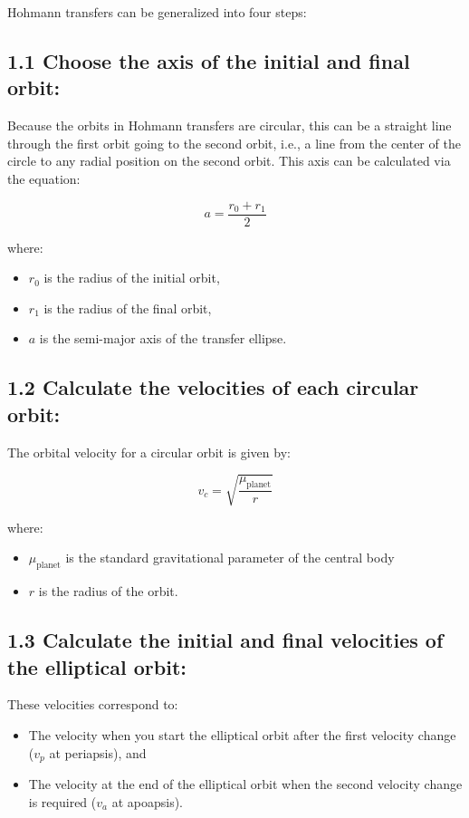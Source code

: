 \documentclass{article}
\numberwithin{figure}{section}
\begin{document}
Hohmann transfers can be generalized into four steps:

\subsection*{1.1 Choose the axis of the initial and final orbit:}
Because the orbits in Hohmann transfers are circular, this can be a straight line through the first orbit going to the second orbit, i.e., a line from the center of the circle to any radial position on the second orbit. This axis can be calculated via the equation:

\[
a = \frac{r_0 + r_1}{2}
\]

where:
\begin{itemize}
    \item \(r_0\) is the radius of the initial orbit,
    \item \(r_1\) is the radius of the final orbit,
    \item \(a\) is the semi-major axis of the transfer ellipse.
\end{itemize}

\subsection*{1.2 Calculate the velocities of each circular orbit:}
The orbital velocity for a circular orbit is given by:

\[
v_{c} = \sqrt{\frac{\mu_{\text{planet}}}{r}}
\]

where:
\begin{itemize}
    \item \(\mu_{\text{planet}}\) is the standard gravitational parameter of the central body
    \item \(r\) is the radius of the orbit.
\end{itemize}

\subsection*{1.3 Calculate the initial and final velocities of the elliptical orbit:}
These velocities correspond to:
\begin{itemize}
    \item The velocity when you start the elliptical orbit after the first velocity change (\(v_p\) at periapsis), and
    \item The velocity at the end of the elliptical orbit when the second velocity change is required (\(v_a\) at apoapsis).
\end{itemize}
\end{document}
